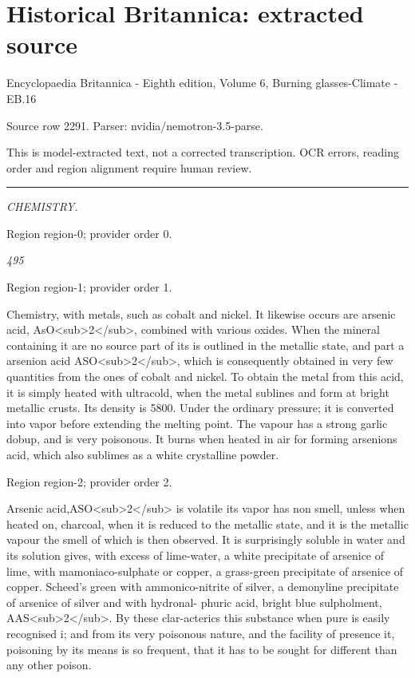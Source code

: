 \documentclass[11pt]{article}
\begin{document}
\section*{Historical Britannica: extracted source}
Encyclopaedia Britannica - Eighth edition, Volume 6, Burning glasses-Climate - EB.16\par
{\small Source row 2291. Parser: nvidia/nemotron-3.5-parse.\par}
{\small This is model-extracted text, not a corrected transcription. OCR errors, reading order and region alignment require human review.\par}
\hrule\medskip
{\small\itshape CHEMISTRY.\par}

{\scriptsize\color{gray} Region region-0; provider order 0.\par}
\medskip

{\small\itshape 495\par}

{\scriptsize\color{gray} Region region-1; provider order 1.\par}
\medskip

Chemistry, with metals, such as cobalt and nickel. It likewise occurs are arsenic acid, AsO<sub>2</sub>, combined with various oxides. When the mineral containing it are no source part of its is outlined in the metallic state, and part a arsenion acid ASO<sub>2</sub>, which is consequently obtained in very few quantities from the ones of cobalt and nickel. To obtain the metal from this acid, it is simply heated with ultracold, when the metal sublines and form at bright metallic crusts. Its density is 5800. Under the ordinary pressure; it is converted into vapor before extending the melting point. The vapour has a strong garlic dobup, and is very poisonous. It burns when heated in air for forming arsenions acid, which also sublimes as a white crystalline powder.
\par

{\scriptsize\color{gray} Region region-2; provider order 2.\par}
\medskip

Arsenic acid,ASO<sub>2</sub> is volatile its vapor has non smell, unless when heated on, charcoal, when it is reduced to the metallic state, and it is the metallic vapour the smell of which is then observed. It is surprisingly soluble in water and its solution gives, with excess of lime-water, a white precipitate of arsenice of lime, with mamoniaco-sulphate or copper, a grass-green precipitate of arsenice of copper. Scheed’s green with ammonico-nitrite of silver, a demonyline precipitate of arsenice of silver and with hydronal- phuric acid, bright blue sulpholment, AAS<sub>2</sub>. By these clar-acterics this substance when pure is easily recognised i; and from its very poisonous nature, and the facility of presence it, poisoning by its means is so frequent, that it has to be sought for different than any other poison.
\par
\end{document}
